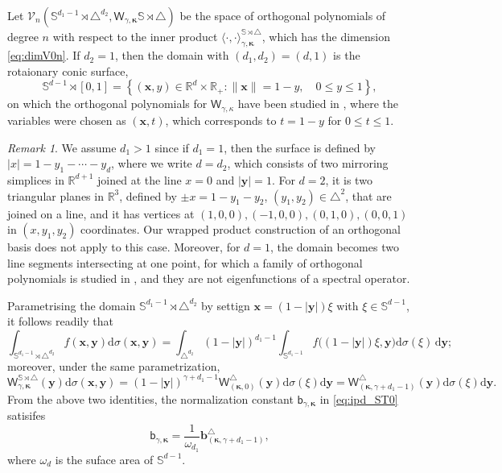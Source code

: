 \documentclass{amsart}
\theoremstyle{remark}
\newtheorem{rem}{Remark}[section]\newtheorem*{notation}{Notation}
\def\la{{\langle}}
\def\ra{{\rangle}}
\def\d{\mathrm{d}}
\def\sph{{\mathbb{S}^{d-1}}}
\def\sb{{\mathsf b}}
\def\sW{{\mathsf W}}
\def\g{{\gamma}}
\def\k{{\kappa}}
\def\o{{\omega}}
\def\s{\sigma}
\def\la{{\langle}}
\def\ra{{\rangle}}
\def\CV{{\mathcal V}}
\def\RR{{\mathbb R}}
\def\SS{{\mathbb S}}
\def\bk{{\boldsymbol{\kappa}}}
\begin{document}
Let $\CV_n(\SS^{d_1-1}\! \rtimes \triangle^{d_2}, \sW_{\g,\bk}{\SS \rtimes \triangle})$ be the space of orthogonal 
polynomials of degree $n$ with respect to the inner product $\la \cdot, \cdot\ra_{\g, \bk}^{\SS\rtimes \triangle}$, 
which has the dimension \eqref{eq:dimV0n}. If $d_2 =1$, then the domain with $(d_1,d_2) = (d,1)$ is the rotaionary 
conic surface,  
$$
  \sph \!\rtimes [0,1] = \left\{(\bm x,y) \in \RR^d \times \RR_+: \|\bm x\| = 1- y, \quad 0 \le y \le 1\right\}, 
$$
on which the orthogonal polynomials for $\sW_{\g,\k}$ have been studied in \cite{X20, X21}, where the 
variables were chosen as $(\bm x,t)$, which corresponds to $t=1-y$ for $0 \le t \le 1$. 

\begin{rem}
We assume $d_1 > 1$ since if $d_1=1$, then the surface 
is defined by $|x| = 1-y_1-\cdots - y_d$, where we write $d = d_2$, which consists of two mirroring simplices in
$\RR^{d+1}$ joined at the line $x=0$ and $|\bm y|=1$. For $d =2$, it is two triangular planes in $\RR^3$, defined by
$\pm x = 1-y_1-y_2$, $(y_1, y_2) \in \triangle^2$, that are joined on a line, and it has vertices at 
$(1,0,0), (-1,0,0), (0,1,0), (0,0,1)$ in $(x,y_1,y_2)$ coordinates. Our wrapped product construction of an 
orthogonal basis does not apply to this case. Moreover, for $d =1$, the domain becomes two line segments 
intersecting at one point, for which a family of orthogonal polynomials is studied in \cite{OX1}, and they are not 
eigenfunctions of a spectral operator. 
\end{rem}

Parametrising the domain $\SS^{d_1-1} \!\rtimes \triangle^{d_2}$ by settign $\bm x = (1- | \bm y|) \xi$ 
with $\xi \in \sph$, it follows readily that 
\begin{equation*} %
  \int_{\SS^{d_1-1} \!\rtimes \triangle^{d_2}} f(\bm x, \bm y) \d\s(\bm x, \bm y) =  \int_{\triangle^{d_2}} (1-|\bm y|)^{d_1-1} \int_{\SS^{d_1-1}}
     f\big( (1-|\bm y|) \xi, \bm y\big) \d \s(\xi)\, \d \bm y;
\end{equation*}
moreover, under the same parametrization, 
$$   
  \sW_{\g,\bm \kappa}^{\SS \rtimes \triangle}(\bm y) \d \s(\bm x, \bm y)
    = (1-|\bm y|)^{\g+ d_1-1} \sW_{(\bk,0)}^\triangle (\bm y) \d\s(\xi) \d \bm y
    =  \sW_{(\bk,\g+d_1-1)}^\triangle (\bm y) \d\s(\xi) \d \bm y.
$$
From the above two identities, the normalization constant $\sb_{\g,\bk}$ in \eqref{eq:ipd_ST0} satisifes
\begin{equation} \label{eq:bV0}
  \sb_{\g,\bk} = \frac{1}{\o_{d_1}} \bm b^\triangle_{(\bk, \g+d_1 -1)},
\end{equation}
where $\o_d$ is the suface area of $\sph$.  
\end{document}
